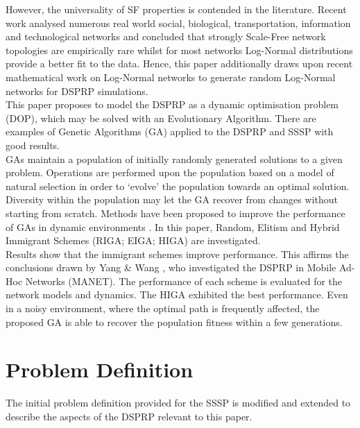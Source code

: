 \documentclass[
	a4paper, %
	10pt, %
	unnumberedsections, %
	twoside, %
]{LTJournalArticle}
\begin{document}
However, the universality of SF properties is contended in the literature. Recent work \cite{broido:19} analysed numerous real world social, biological, transportation, information and technological networks and concluded that strongly Scale-Free network topologies are empirically rare whilst for most networks Log-Normal distributions provide a better fit to the data. Hence, this paper additionally draws upon recent mathematical work on Log-Normal networks \cite{smith:21} to generate random Log-Normal networks for DSPRP simulations. \\

This paper proposes to model the DSPRP as a dynamic optimisation problem (DOP), which may be solved with an Evolutionary Algorithm. There are examples of Genetic Algorithms (GA) applied to the DSPRP \cite{kumar:10} \cite{yang:10} and SSSP \cite{yussof:09} with good results. \\

GAs maintain a population of initially randomly generated solutions to a given problem. Operations are performed upon the population based on a model of natural selection in order to `evolve' the population towards an optimal solution. Diversity within the population may let the GA recover from changes without starting from scratch. Methods have been proposed to improve the performance of GAs in dynamic environments \cite{yang:08}. In this paper, Random, Elitism and Hybrid Immigrant Schemes (RIGA; EIGA; HIGA) are investigated. \\ 

Results show that the immigrant schemes improve performance. This affirms the conclusions drawn by Yang \& Wang \cite{yang:10}, who investigated the DSPRP in Mobile Ad-Hoc Networks (MANET). The performance of each scheme is evaluated for the network models and dynamics. The HIGA exhibited the best performance. Even in a noisy environment, where the optimal path is frequently affected, the proposed GA is able to recover the population fitness within a few generations.  \\ 


\section{Problem Definition}
The initial problem definition provided for the SSSP is modified and extended to describe the aspects of the DSPRP relevant to this paper. \\
\end{document}
